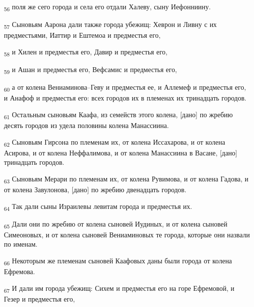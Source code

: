 \begin{tcolorbox}
\textsubscript{56} поля же сего города и села его отдали Халеву, сыну Иефонниину.
\end{tcolorbox}
\begin{tcolorbox}
\textsubscript{57} Сыновьям Аарона дали также города убежищ: Хеврон и Ливну с их предместьями, Иаттир и Ештемоа и предместья его,
\end{tcolorbox}
\begin{tcolorbox}
\textsubscript{58} и Хилен и предместья его, Давир и предместья его,
\end{tcolorbox}
\begin{tcolorbox}
\textsubscript{59} и Ашан и предместья его, Вефсамис и предместья его,
\end{tcolorbox}
\begin{tcolorbox}
\textsubscript{60} а от колена Вениаминова--Геву и предместья ее, и Аллемеф и предместья его, и Анафоф и предместья его: всех городов их в племенах их тринадцать городов.
\end{tcolorbox}
\begin{tcolorbox}
\textsubscript{61} Остальным сыновьям Каафа, из семейств этого колена, [дано] по жребию десять городов из удела половины колена Манассиина.
\end{tcolorbox}
\begin{tcolorbox}
\textsubscript{62} Сыновьям Гирсона по племенам их, от колена Иссахарова, и от колена Асирова, и от колена Неффалимова, и от колена Манассиина в Васане, [дано] тринадцать городов.
\end{tcolorbox}
\begin{tcolorbox}
\textsubscript{63} Сыновьям Мерари по племенам их, от колена Рувимова, и от колена Гадова, и от колена Завулонова, [дано] по жребию двенадцать городов.
\end{tcolorbox}
\begin{tcolorbox}
\textsubscript{64} Так дали сыны Израилевы левитам города и предместья их.
\end{tcolorbox}
\begin{tcolorbox}
\textsubscript{65} Дали они по жребию от колена сыновей Иудиных, и от колена сыновей Симеоновых, и от колена сыновей Вениаминовых те города, которые они назвали по именам.
\end{tcolorbox}
\begin{tcolorbox}
\textsubscript{66} Некоторым же племенам сыновей Каафовых даны были города от колена Ефремова.
\end{tcolorbox}
\begin{tcolorbox}
\textsubscript{67} И дали им города убежищ: Сихем и предместья его на горе Ефремовой, и Гезер и предместья его,
\end{tcolorbox}
